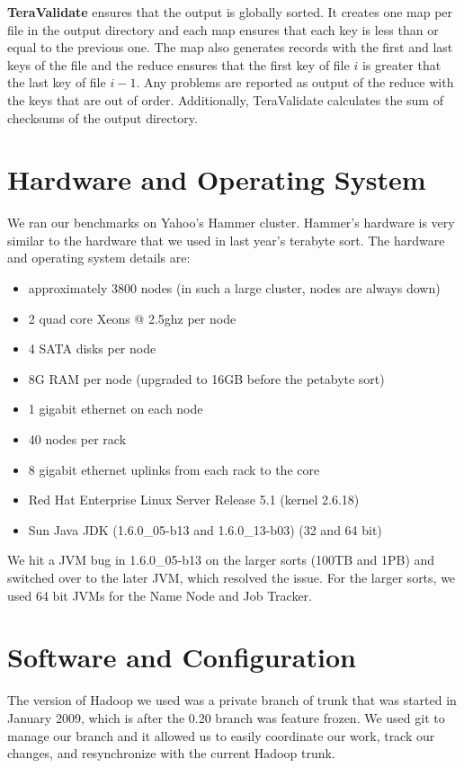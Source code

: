 \documentclass{article}
\begin{document}
\textbf{TeraValidate} ensures that the output is globally sorted. It
creates one map per file in the output directory and each map
ensures that each key is less than or equal to the previous one. The
map also generates records with the first and last keys of the file
and the reduce ensures that the first key of file $i$ is greater that
the last key of file $i-1$. Any problems are reported as output of the
reduce with the keys that are out of order. Additionally, TeraValidate
calculates the sum of checksums of the output directory.

\section{Hardware and Operating System}

We ran our benchmarks on Yahoo's Hammer cluster. Hammer's hardware is
very similar to the hardware that we used in last year's terabyte
sort. The hardware and operating system details are:

\begin{itemize}
\item approximately 3800 nodes (in such a large cluster, nodes are
  always down)
\item 2 quad core Xeons @ 2.5ghz per node
\item 4 SATA disks per node
\item 8G RAM per node (upgraded to 16GB before the petabyte sort)
\item 1 gigabit ethernet on each node
\item 40 nodes per rack
\item 8 gigabit ethernet uplinks from each rack to the core
\item Red Hat Enterprise Linux Server Release 5.1 (kernel 2.6.18)
\item Sun Java JDK (1.6.0\_05-b13 and 1.6.0\_13-b03) (32 and 64 bit)
\end{itemize}

We hit a JVM bug in 1.6.0\_05-b13 on the larger sorts (100TB and 1PB)
and switched over to the later JVM, which resolved the issue. For the
larger sorts, we used 64 bit JVMs for the Name Node and Job Tracker.

\section{Software and Configuration}

The version of Hadoop we used was a private branch of trunk that was
started in January 2009, which is after the 0.20 branch was feature
frozen. We used git to manage our branch and it allowed us to easily
coordinate our work, track our changes, and resynchronize with the
current Hadoop trunk.
\end{document}
